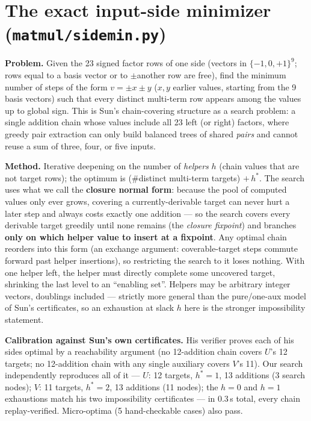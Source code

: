\documentclass[10pt]{article}
\begin{document}
\section{The exact input-side minimizer
(\texttt{matmul/sidemin.py})}\label{sec:in}

\textbf{Problem.} Given the 23 signed factor rows of one side (vectors
in $\{-1,0,+1\}^9$; rows equal to a basis vector or to $\pm$another row
are free), find the minimum number of steps of the form $v = \pm x \pm
y$ ($x, y$ earlier values, starting from the 9 basis vectors) such that
every distinct multi-term row appears among the values up to global
sign. This is Sun's chain-covering structure as a search problem: a
single addition chain whose values include all 23 left (or right)
factors, where greedy pair extraction can only build balanced trees of
shared \emph{pairs} and cannot reuse a sum of three, four, or five
inputs.

\textbf{Method.} Iterative deepening on the number of \emph{helpers}
$h$ (chain values that are not target rows); the optimum is
(\#distinct multi-term targets) $+\, h^{*}$. The search uses what we
call the \textbf{closure normal form}: because the pool of computed
values only ever grows, covering a currently-derivable target can never
hurt a later step and always costs exactly one addition --- so the
search covers every derivable target greedily until none remains (the
\emph{closure fixpoint}) and branches \textbf{only on which helper
value to insert at a fixpoint}. Any optimal chain reorders into this
form (an exchange argument: coverable-target steps commute forward past
helper insertions), so restricting the search to it loses nothing. With
one helper left, the helper must directly complete some uncovered
target, shrinking the last level to an ``enabling set''. Helpers may be
arbitrary integer vectors, doublings included --- strictly more general
than the pure/one-aux model of Sun's certificates, so an exhaustion at
slack $h$ here is the stronger impossibility statement.

\textbf{Calibration against Sun's own certificates.} His verifier
proves each of his sides optimal by a reachability argument (no
12-addition chain covers $U$'s 12 targets; no 12-addition chain with
any single auxiliary covers $V$'s 11). Our search independently
reproduces all of it --- $U$: 12 targets, $h^{*}=1$, 13 additions (3
search nodes); $V$: 11 targets, $h^{*}=2$, 13 additions (11 nodes); the
$h=0$ and $h=1$ exhaustions match his two impossibility certificates
--- in 0.3\,s total, every chain replay-verified. Micro-optima (5
hand-checkable cases) also pass.
\end{document}

